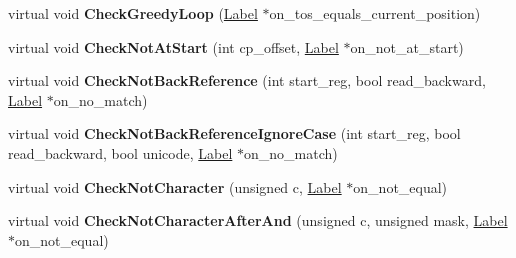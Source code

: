 \begin{DoxyCompactItemize}
\item 
virtual void {\bfseries Check\+Greedy\+Loop} (\hyperlink{classv8_1_1internal_1_1_label}{Label} $\ast$on\+\_\+tos\+\_\+equals\+\_\+current\+\_\+position)\hypertarget{classv8_1_1internal_1_1_reg_exp_macro_assembler_a_r_m64_a78b86fb0cc69f34cccc84b776eeb6b8a}{}\label{classv8_1_1internal_1_1_reg_exp_macro_assembler_a_r_m64_a78b86fb0cc69f34cccc84b776eeb6b8a}

\item 
virtual void {\bfseries Check\+Not\+At\+Start} (int cp\+\_\+offset, \hyperlink{classv8_1_1internal_1_1_label}{Label} $\ast$on\+\_\+not\+\_\+at\+\_\+start)\hypertarget{classv8_1_1internal_1_1_reg_exp_macro_assembler_a_r_m64_a15a4ce2aad4da4d8c7892ec1ba908a11}{}\label{classv8_1_1internal_1_1_reg_exp_macro_assembler_a_r_m64_a15a4ce2aad4da4d8c7892ec1ba908a11}

\item 
virtual void {\bfseries Check\+Not\+Back\+Reference} (int start\+\_\+reg, bool read\+\_\+backward, \hyperlink{classv8_1_1internal_1_1_label}{Label} $\ast$on\+\_\+no\+\_\+match)\hypertarget{classv8_1_1internal_1_1_reg_exp_macro_assembler_a_r_m64_a4541bbaffaebe67fe3e140ec6f629a1c}{}\label{classv8_1_1internal_1_1_reg_exp_macro_assembler_a_r_m64_a4541bbaffaebe67fe3e140ec6f629a1c}

\item 
virtual void {\bfseries Check\+Not\+Back\+Reference\+Ignore\+Case} (int start\+\_\+reg, bool read\+\_\+backward, bool unicode, \hyperlink{classv8_1_1internal_1_1_label}{Label} $\ast$on\+\_\+no\+\_\+match)\hypertarget{classv8_1_1internal_1_1_reg_exp_macro_assembler_a_r_m64_a708f47b12068cff72e38264211aee036}{}\label{classv8_1_1internal_1_1_reg_exp_macro_assembler_a_r_m64_a708f47b12068cff72e38264211aee036}

\item 
virtual void {\bfseries Check\+Not\+Character} (unsigned c, \hyperlink{classv8_1_1internal_1_1_label}{Label} $\ast$on\+\_\+not\+\_\+equal)\hypertarget{classv8_1_1internal_1_1_reg_exp_macro_assembler_a_r_m64_ae6adab3836146980b70e883babe42ec6}{}\label{classv8_1_1internal_1_1_reg_exp_macro_assembler_a_r_m64_ae6adab3836146980b70e883babe42ec6}

\item 
virtual void {\bfseries Check\+Not\+Character\+After\+And} (unsigned c, unsigned mask, \hyperlink{classv8_1_1internal_1_1_label}{Label} $\ast$on\+\_\+not\+\_\+equal)\hypertarget{classv8_1_1internal_1_1_reg_exp_macro_assembler_a_r_m64_a066c4128055d23a27c84c4fe647636b2}{}\label{classv8_1_1internal_1_1_reg_exp_macro_assembler_a_r_m64_a066c4128055d23a27c84c4fe647636b2}


\end{DoxyCompactItemize}
